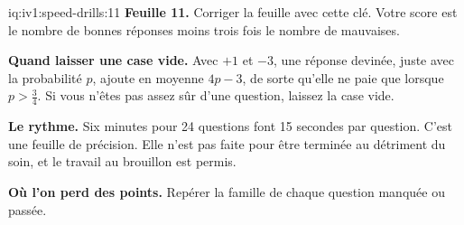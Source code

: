 \begin{solution}{iq:iv1:speed-drills:11}
\textbf{Feuille 11.} Corriger la feuille avec cette clé. Votre score est le nombre de bonnes réponses moins trois fois le nombre de mauvaises.
\par\nopagebreak


\textbf{Quand laisser une case vide.} Avec $+1$ et $-3$, une réponse devinée, juste avec la probabilité $p$, ajoute en moyenne $4p - 3$, de sorte qu'elle ne paie que lorsque $p > \tfrac34$. Si vous n'êtes pas assez sûr d'une question, laissez la case vide.

\textbf{Le rythme.} Six minutes pour 24 questions font 15 secondes par question. C'est une feuille de précision. Elle n'est pas faite pour être terminée au détriment du soin, et le travail au brouillon est permis.

\textbf{Où l'on perd des points.} Repérer la famille de chaque question manquée ou passée.


\end{solution}

